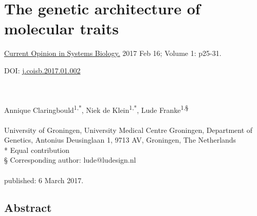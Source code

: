 \chapter[The genetic architecture of molecular traits]{The genetic architecture of molecular traits}
\label{chap:chapter2-genetic-architecture}

\hfill \underline{Current Opinion in Systems Biology.} 2017 Feb 16; Volume 1: p25-31.

\hfill DOI: \href{https://doi.org/10.1016/j.coisb.2017.01.002}{j.coisb.2017.01.002}


\noindent
\\
\\
Annique Claringbould\textsuperscript{1,*}, Niek de Klein\textsuperscript{1,*}, Lude Franke\textsuperscript{1,§}
\\
\\
 University of Groningen, University Medical Centre Groningen, Department of Genetics, Antonius Deusinglaan 1, 9713 AV, Groningen, The Netherlands\\
* Equal contribution\\
§ Corresponding author: lude@ludesign.nl
\\
\\
\noindent
published: 6 March 2017.



\section*{Abstract}

